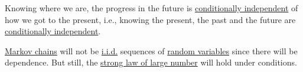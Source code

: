 \begin{intuition}
	Knowing where we are, the progress in the future is \hyperref[def:conditionally-independent]{conditionally independent} of how we got to the present, i.e.,
	knowing the present, the past and the future are \hyperref[def:conditionally-independent]{conditionally independent}.
\end{intuition}

\begin{note}
	\hyperref[def:Markov-chain]{Markov chains} will not be \hyperref[def:i.i.d.]{i.i.d.} sequences of \hyperref[def:random-variable]{random variables}
	since there will be dependence. But still, the \hyperref[thm:SLLN]{strong law of large number} will hold under conditions.
\end{note}

